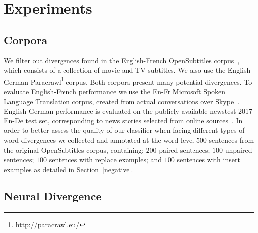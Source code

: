 \documentclass[11pt,a4paper]{article}
\begin{document}
\section{Experiments}
\label{experiments}


\subsection{Corpora}
\label{corpora}

We filter out divergences found in the English-French OpenSubtitles corpus~\cite{LisonTiedemann2016}, which consists of a collection of movie and TV subtitles. We also use the English-German Paracrawl\footnote{http://paracrawl.eu/} corpus. 
Both corpora present many potential divergences.
To evaluate English-French performance we use the En-Fr Microsoft Spoken Language Translation corpus, created from actual conversations over Skype~\cite{mslt-corpus-iwslt-2016-release}. 
English-German performance is evaluated on the publicly available newstest-2017 En-De test set, corresponding to news stories selected from online sources~\cite{W17-4717}.
In order to better assess the quality of our classifier when facing different types of word divergences we collected and annotated at the word level $500$ sentences from the original OpenSubtitles corpus, containing:
$200$ paired sentences;
$100$ unpaired sentences;
$100$ sentences with replace examples; and
$100$ sentences with insert examples as detailed in Section~\ref{negative}.




\subsection{Neural Divergence}
\label{divergence}
\end{document}

